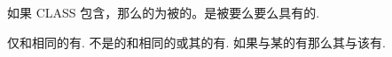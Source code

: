 如果 CLASS \TypeSpecifier{}包含\Type{}\Name{}，那么\Polymorphic{}\Entity{}的\DeclaredType{}为被\Specify{}的\Type{}。\DeclaredType{}是\Data{}\Entity{}被要么\Explicitly{}要么\Implicitly{}\Declare{}具有的\Type{}.

\Nonpolymorphic{}\Entity{}仅和相同\DeclaredType{}的\Entity{}有\Type{}\Compatibility{}. 不是\UnlimitedPolymorphic{}\Entity{}的\Polymorphic{}\Entity{}和相同\DeclaredType{}的或其\Extension{}的\Entity{}有\Type{}\Compatibility{}. 如果\Entity{}与某\Type{}的\Entity{}有\Type{}\Compatibility{}那么其与该\Type{}有\Type{}\Compatibility{}.
